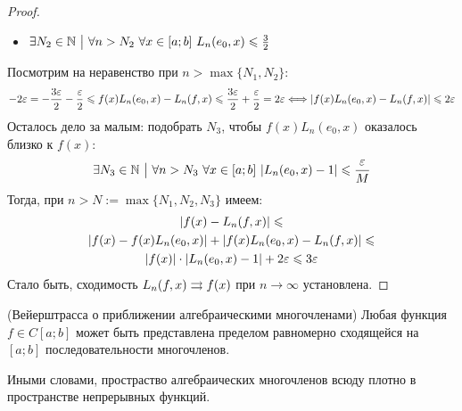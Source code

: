 \begin{proof}
\begin{itemize}
		\item $\exists N_2 \in \mathbb{N} \ \big|\  \forall n > N_2\ \forall x \in [a; b]\ L_n(e_0, x) \leqslant \frac{3}{2}$
	\end{itemize}
	Посмотрим на неравенство при $n > \max\{N_1, N_2\}$:
	\[
		-2\varepsilon = -\frac{3\varepsilon}{2} - \frac{\varepsilon}{2} \leqslant f(x)L_n(e_0, x) - L_n(f, x) \leqslant \frac{3\varepsilon}{2} + \frac{\varepsilon}{2} = 2\varepsilon \Longleftrightarrow |f(x)L_n(e_0, x) - L_n(f, x)| \leqslant 2\varepsilon
	\]
	Осталось дело за малым: подобрать $N_3$, чтобы $f(x)L_n(e_0, x)$ оказалось близко к $f(x)$:
	\[
		\exists N_3 \in \mathbb{N} \ \big|\  \forall n > N_3\ \forall x \in [a; b]\ |L_n(e_0, x) - 1| \leqslant \frac{\varepsilon}{M}
	\]
	Тогда, при $n > N := \max\{N_1, N_2, N_3\}$ имеем:
	\begin{multline*}
		|f(x) - L_n(f, x)| \leqslant
		\\
		|f(x) - f(x)L_n(e_0, x)| + |f(x)L_n(e_0, x) - L_n(f, x)| \leqslant
		\\
		|f(x)| \cdot |L_n(e_0, x) - 1| + 2\varepsilon \leqslant 3\varepsilon
	\end{multline*}
	Стало быть, сходимость $L_n(f, x) \rightrightarrows f(x)$ при $n \to \infty$ установлена.
\end{proof}

\begin{theorem} (Вейерштрасса о приближении алгебраическими многочленами)
	Любая функция $f \in C[a; b]$ может быть представлена пределом равномерно сходящейся на $[a; b]$ последовательности многочленов.
\end{theorem}

\begin{note}
	Иными словами, простраство алгебраических многочленов всюду плотно в пространстве непрерывных функций.
\end{note}

